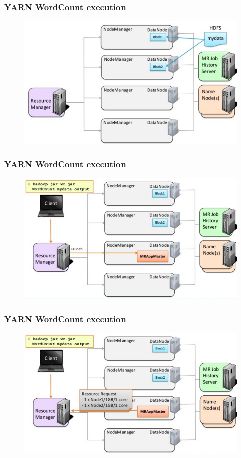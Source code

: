 \begin{frame}
\frametitle{YARN WordCount execution}
\begin{figure}[h]
  \centering
  \includegraphics[scale=0.4]{./figures/yarn_wc2}
  \label{fig:yarn_wc2}
\end{figure}
\end{frame}

\begin{frame}
\frametitle{YARN WordCount execution}
\begin{figure}[h]
  \centering
  \includegraphics[scale=0.4]{./figures/yarn_wc3}
  \label{fig:yarn_wc3}
\end{figure}
\end{frame}

\begin{frame}
\frametitle{YARN WordCount execution}
\begin{figure}[h]
  \centering
  \includegraphics[scale=0.4]{./figures/yarn_wc4}
  \label{fig:yarn_wc4}
\end{figure}
\end{frame}


